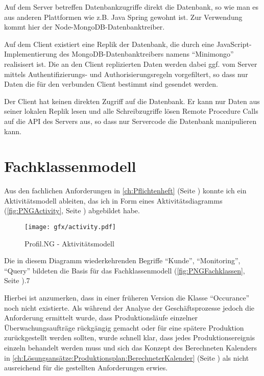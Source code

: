 Auf dem Server betreffen Datenbankzugriffe direkt die Datenbank, so wie man es aus
anderen Plattformen wie z.B. Java Spring gewohnt ist. Zur Verwendung kommt hier
der Node-MongoDB-Datenbanktreiber.

Auf dem Client existiert eine Replik der Datenbank, die durch eine
JavaScript-Implementierung des MongoDB-Datenbanktreibers namens "`Minimongo"'
\cite{minimongo} realisisert ist. Die an den Client replizierten Daten werden
dabei ggf. vom Server mittels Authentifizierungs- und Authorisierungsregeln
vorgefiltert, so dass nur Daten die für den verbunden Client bestimmt sind
gesendet werden.

Der Client hat keinen direkten Zugriff auf die Datenbank. Er kann nur Daten aus
seiner lokalen Replik lesen und alle Schreibzugriffe lösen Remote Procedure
Calls auf die API des Servers aus, so dass nur Servercode die Datenbank
manipulieren kann.

\section{Fachklassenmodell}

Aus den fachlichen Anforderungen in \autoref{ch:Pflichtenheft}
(Seite \pageref{ch:Pflichtenheft}) konnte ich ein Aktivitätsmodell ableiten, das ich
in Form eines Aktivitätsdiagramms (\autoref{fig:PNGActivity}, Seite
\pageref{fig:PNGActivity}) abgebildet habe.

\begin{figure}[H]
  \texttt{[image: gfx/activity.pdf]}
  \caption{Profil.NG - Aktivitätsmodell}
  \label{fig:PNGActivity}
\end{figure}

Die in diesem Diagramm wiederkehrenden Begriffe "`Kunde"', "`Monitoring"',
"`Query"' bildeten die Basis für das Fachklassenmodell
(\autoref{fig:PNGFachklassen}, Seite \pageref{fig:PNGFachklassen}).7

Hierbei ist anzumerken, dass in einer früheren Version die Klasse "`Occurance"'
noch nicht existierte. Als während der Analyse der Geschäftsprozesse jedoch die
Anforderung ermittelt wurde, dass Produktionsläufe einzelner
Überwachungsaufträge rückgängig gemacht oder für eine spätere Produktion
zurückgestellt werden sollten, wurde schnell klar, dass jedes
Produktionsereignis einzeln behandelt werden muss und sich das Konzept des
Berechneten Kalenders in
\autoref{ch:Lösungsansätze:Produktionsplan:BerechneterKalender} (Seite
\pageref{ch:Lösungsansätze:Produktionsplan:BerechneterKalender}) als nicht
ausreichend für die gestellten Anforderungen erwies.

